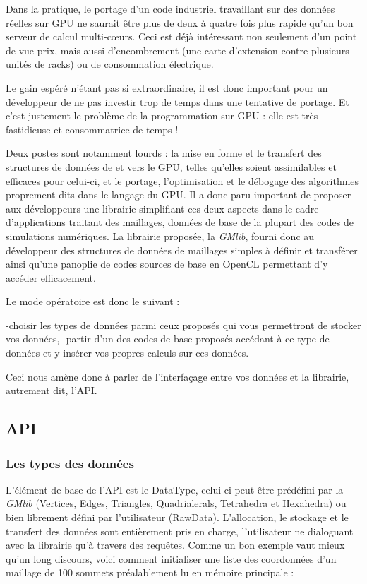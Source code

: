 \documentclass[a4paper,12pt]{article}
\begin{document}
Dans la pratique, le portage d'un code industriel travaillant sur des données réelles sur GPU ne saurait être plus de deux à quatre fois plus rapide qu'un bon serveur de calcul multi-c\oe urs. Ceci est déjà intéressant non seulement d'un point de vue prix, mais aussi d'encombrement (une carte d'extension contre plusieurs unités de racks) ou de consommation électrique.

Le gain espéré n'étant pas si extraordinaire, il est donc important pour un développeur de ne pas investir trop de temps dans une tentative de portage. Et c'est justement le problème de la programmation sur GPU : elle est très fastidieuse et consommatrice de temps !

Deux postes sont notamment lourds : la mise en forme et le transfert des structures de données de et vers le GPU, telles qu'elles soient assimilables et efficaces pour celui-ci, et le portage, l'optimisation et le débogage des algorithmes proprement dits dans le langage du GPU.
Il a donc paru important de proposer aux développeurs une librairie simplifiant ces deux aspects dans le cadre d'applications traitant des maillages, données de base de la plupart des codes de simulations numériques. La librairie proposée, la \emph{GMlib}, fourni donc au développeur des structures de données de maillages simples à définir et transférer ainsi qu'une panoplie de codes sources de base en OpenCL permettant d'y accéder efficacement.

Le mode opératoire est donc le suivant :

-choisir les types de données parmi ceux proposés qui vous permettront de stocker vos données,
-partir d'un des codes de base proposés accédant à ce type de données et y insérer vos propres calculs sur ces données.

Ceci nous amène donc à parler de l'interfaçage entre vos données et la librairie, autrement dit, l'API.

\subsection{API}

\subsubsection*{Les types des données}
L'élément de base de l'API est le DataType, celui-ci peut être prédéfini par la \emph{GMlib} (Vertices, Edges, Triangles, Quadrialerals, Tetrahedra et Hexahedra) ou bien librement défini par l'utilisateur (RawData). L'allocation, le stockage et le transfert des données sont entièrement pris en charge, l'utilisateur ne dialoguant avec la librairie qu'à travers des requêtes. Comme un bon exemple vaut mieux qu'un long discours, voici comment initialiser une liste des coordonnées d'un maillage de 100 sommets préalablement lu en mémoire principale :
\end{document}
